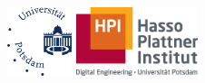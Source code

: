 \pagestyle{empty}
\frontmatter

\vphantom{hack}%
{%
	\vspace{3cm}
	\begin{center}
		\noindent\includegraphics[height=20mm]{layout/up}\hspace{2cm}
		\includegraphics[height=20mm]{layout/hpi}
		
		\vspace{1.7cm}
		\par 
		\vspace{1cm}
	\end{center}
}
\cleardoublepage


